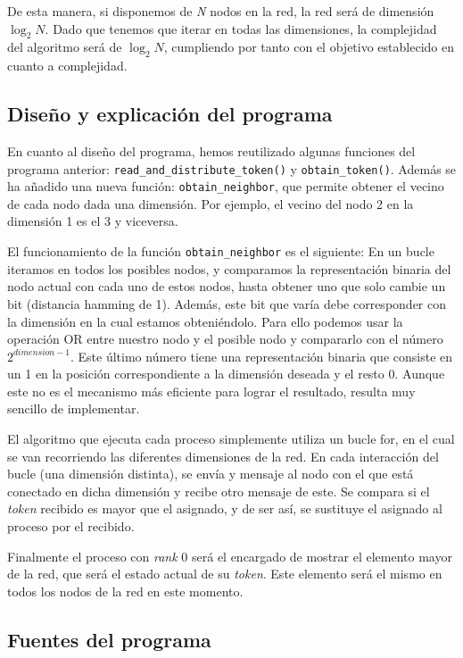 \documentclass[11pt]{article}
\begin{document}
De esta manera, si disponemos de \emph{N} nodos en la red, la red será de dimensión $\log_2{N}$. Dado que tenemos que iterar en todas las dimensiones, la complejidad del algoritmo será de $\log_2{N}$, cumpliendo por tanto con el objetivo establecido en cuanto a complejidad.


\subsection{Diseño y explicación del programa}
En cuanto al diseño del programa, hemos reutilizado algunas funciones del programa anterior: \texttt{read\_and\_distribute\_token()} y \texttt{obtain\_token()}. Además se ha añadido una nueva función: \texttt{obtain\_neighbor}, que permite obtener el vecino de cada nodo dada una dimensión. Por ejemplo, el vecino del nodo 2 en la dimensión 1 es el 3 y viceversa. 

El funcionamiento de la función \texttt{obtain\_neighbor} es el siguiente: En un bucle iteramos en todos los posibles nodos, y comparamos la representación binaria del nodo actual con cada uno de estos nodos, hasta obtener uno que solo cambie un bit (distancia hamming de 1). Además, este bit que varía debe corresponder con la dimensión en la cual estamos obteniéndolo. Para ello podemos usar la operación OR entre nuestro nodo y el posible nodo y compararlo con el número $2^{dimension - 1}$. Este último número tiene una representación binaria que consiste en un 1 en la posición correspondiente a la dimensión deseada y el resto 0. Aunque este no es el mecanismo más eficiente para lograr el resultado, resulta muy sencillo de implementar.

El algoritmo que ejecuta cada proceso simplemente utiliza un bucle for, en el cual se van recorriendo las diferentes dimensiones de la red. En cada interacción del bucle (una dimensión distinta), se envía y mensaje al nodo con el que está conectado en dicha dimensión y recibe otro mensaje de este. Se compara si el \emph{token} recibido es mayor que el asignado, y de ser así, se sustituye el asignado al proceso por el recibido.

Finalmente el proceso con \emph{rank} 0 será el encargado de mostrar el elemento mayor de la red, que será el estado actual de su \emph{token}. Este elemento será el mismo en todos los nodos de la red en este momento.


\subsection{Fuentes del programa}

\end{document}

